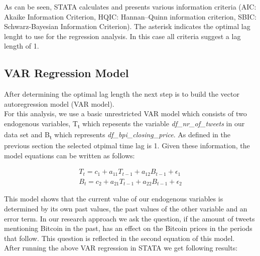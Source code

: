 \documentclass[a4paper,american,12pt]{article}
\begin{document}
\begin{spacing}{1.2}
As can be seen, STATA calculates and presents various information criteria (AIC: Akaike Information Criterion, HQIC: Hannan–Quinn information criterion, SBIC: Schwarz-Bayesian Information Criterion). The asterisk indicates the optimal lag lenght to use for the regression analysis. In this case all criteria suggest a lag length of 1.
		
\subsection{VAR Regression Model}
After determining the optimal lag length the next step is to build the vector autoregression model (VAR model).\\
For this analysis, we use a basic unrestricted VAR model which consists of two endogenous variables, T\textsubscript t which repesents the variable {\itshape df\_nr\_of\_tweets} in our data set and B\textsubscript t which represents {\itshape df\_bpi\_closing\_price}. As defined in the previous section the selected otpimal time lag is 1. Given these information, the model equations can be written as follows:

\begin{equation}
\begin{split}
T_t = c_1 + a_{11}T_{t-1} + a_{12}B_{t-1} + \epsilon_1 \\
B_t = c_2 + a_{21}T_{t-1} + a_{22}B_{t-1} + \epsilon_2
\end{split}
\end{equation}

This model shows that the current value of our endogenous variables is determined by its own past values, the past values of the other variable and an error term. In our research approach we ask the question, if the amount of tweets mentioning Bitcoin in the past, has an effect on the Bitcoin prices in the periods that follow. This question is reflected in the second equation of this model.\\

After running the above VAR regression in STATA we get following results:
	

\end{spacing}
\end{document}
